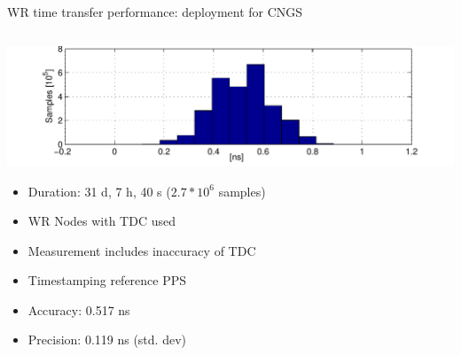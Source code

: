 \documentclass[compress,red]{beamer}
\begin{document}
\begin{frame}{WR time transfer performance: deployment for CNGS}

  \begin{columns}[c]
	  \begin{center}

		\hspace{-1cm}
		\includegraphics[width=1.1\textwidth]{../../figures/measurements/histogram-small.pdf}
		\begin{itemize}
		       \item Duration: 31 d, 7 h, 40 s ($2.7*10^6$ samples)
		       \item WR Nodes with TDC used
		       \item Measurement includes inaccuracy of TDC
		       \item Timestamping reference PPS
		       	\item Accuracy: 0.517 ns
			\item Precision: 0.119 ns (std. dev)
		\end{itemize}			



\end{center}
\end{columns}
\end{frame}
\end{document}
